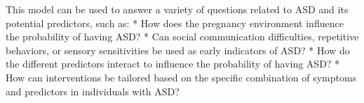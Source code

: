 This model can be used to answer a variety of questions related to ASD
and its potential predictors, such as: * How does the pregnancy
environment influence the probability of having ASD? * Can social
communication difficulties, repetitive behaviors, or sensory
sensitivities be used as early indicators of ASD? * How do the
different predictors interact to influence the probability of having
ASD? * How can interventions be tailored based on the specific
combination of symptoms and predictors in individuals with ASD?
